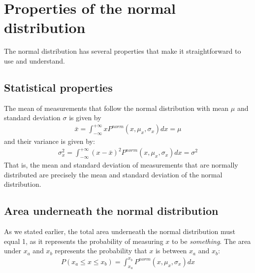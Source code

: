 \section{Properties of the normal distribution}
The normal distribution has several properties that make it straightforward to use and understand.
\subsection{Statistical properties}
The mean of measurements that follow the normal distribution with mean $\mu$ and standard deviation $\sigma$ is given by
\begin{align}
\bar x = \int_{-\infty}^{+\infty}xP^{norm}(x,\mu_x,\sigma_x)dx=\mu
\end{align}
and their variance is given by:
\begin{align}
\sigma_x^2 = \int_{-\infty}^{+\infty}(x-\bar x)^2P^{norm}(x,\mu_x,\sigma_x)dx=\sigma^2
\end{align}
That is, the mean and standard deviation of measurements that are normally distributed are precisely the mean and standard deviation of the normal distribution.

\subsection{Area underneath the normal distribution}
As we stated earlier, the total area underneath the normal distribution must equal 1, as it represents the probability of measuring $x$ to be \textit{something}. The area under $x_a$ and $x_b$ represents the probability that $x$ is between $x_a$ and $x_b$:
\begin{align}
P(x_a \leq x \leq x_b) = \int_{x_a}^{x_b}P^{norm}(x,\mu_x,\sigma_x)dx
\end{align}

